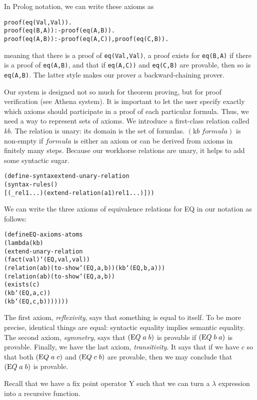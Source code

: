 In Prolog notation, we can write these axioms as
\begin{alltt}
proof(eq(Val,Val)).
proof(eq(B,A)) :- proof(eq(A,B)).
proof(eq(A,B)) :- proof(eq(A,C)), proof(eq(C,B)).
\end{alltt}
meaning that there is a proof of
\texttt{eq(Val,Val)}, a proof exists for \texttt{eq(B,A)} if there is a proof of
\texttt{eq(A,B)}, and that if \texttt{eq(A,C))} and \texttt{eq(C,B)} are
provable, then so is \texttt{eq(A,B)}.  The latter style makes our prover a
backward-chaining prover.

Our system is designed not so much for theorem proving, but for proof
verification (see Athena system).  It is important to let
the user specify exactly which axioms should participate in a proof of
each particular formula. Thus, we need a way to represent sets of
axioms. We introduce a first-class relation called \emph{kb}. The relation is
unary: its domain is the set of formulas. $({\mathrm kb} \; formula)$ is non-empty if
$formula$ is either an axiom or can be derived from axioms in finitely
many steps. Because our workhorse relations are unary, it helps
to add some syntactic sugar.
\begin{alltt}
(define-syntax extend-unary-relation
  (syntax-rules ()
    [(_ rel1 ...) (extend-relation (a1) rel1 ...)]))
\end{alltt}

We can write the three axioms of equivalence relations for EQ in our
notation as follows:

\begin{alltt}
(define EQ-axioms-atoms
  (lambda (kb)
    (extend-unary-relation
      (fact (val) `(EQ ,val ,val))
      (relation (a b) (to-show `(EQ ,a ,b)) (kb `(EQ ,b ,a)))
      (relation (a b) (to-show `(EQ ,a ,b))
        (exists (c)
          (kb `(EQ ,a ,c))
          (kb `(EQ ,c ,b)))))))
\end{alltt}

The first axiom, \emph{reflexivity}, says that something is equal to
itself.  To be more precise, identical things are equal: syntactic equality
implies semantic equality.  The second axiom, \emph{symmetry}, says that
$({\textrm EQ} \; a \; b)$ is provable if $({\textrm EQ} \; b \; a)$ is
provable.  Finally, we have the last axiom, \emph{transitivity}.  It says
that if we have $c$ so that both $({\textrm EQ} \; a \; c)$ and $({\textrm
EQ} \; c \; b)$ are provable, then we may conclude that $({\textrm EQ} \; a
\; b)$ is provable.

Recall that we have a fix point operator Y such that we can turn a
$\lambda$ expression into a recursive function.

